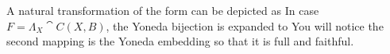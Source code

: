 A natural transformation of the form
can be depicted as
In case $F = \Lambda_X\cat{C}(X,B)$, the Yoneda bijection is expanded to
You will notice the second mapping is the Yoneda embedding so that %
it is full and faithful.
